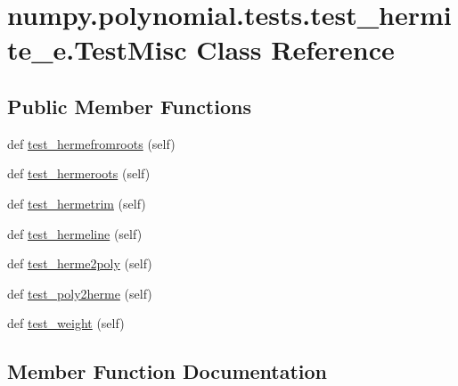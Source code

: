 \hypertarget{classnumpy_1_1polynomial_1_1tests_1_1test__hermite__e_1_1TestMisc}{}\section{numpy.\+polynomial.\+tests.\+test\+\_\+hermite\+\_\+e.\+Test\+Misc Class Reference}
\label{classnumpy_1_1polynomial_1_1tests_1_1test__hermite__e_1_1TestMisc}
\subsection*{Public Member Functions}
\begin{DoxyCompactItemize}
\item 
def \hyperlink{classnumpy_1_1polynomial_1_1tests_1_1test__hermite__e_1_1TestMisc_a3119984cedad7164881e867c00b48673}{test\+\_\+hermefromroots} (self)
\item 
def \hyperlink{classnumpy_1_1polynomial_1_1tests_1_1test__hermite__e_1_1TestMisc_a8bb2872e6118989474bf3235432a8207}{test\+\_\+hermeroots} (self)
\item 
def \hyperlink{classnumpy_1_1polynomial_1_1tests_1_1test__hermite__e_1_1TestMisc_a123f09b85024e0ff541f8f2bd3447167}{test\+\_\+hermetrim} (self)
\item 
def \hyperlink{classnumpy_1_1polynomial_1_1tests_1_1test__hermite__e_1_1TestMisc_a9c07f3dfb7f2b89b2c8d005c746a1ab7}{test\+\_\+hermeline} (self)
\item 
def \hyperlink{classnumpy_1_1polynomial_1_1tests_1_1test__hermite__e_1_1TestMisc_a5b0a5452b66931625fcea583bfe04807}{test\+\_\+herme2poly} (self)
\item 
def \hyperlink{classnumpy_1_1polynomial_1_1tests_1_1test__hermite__e_1_1TestMisc_a2cc8d6dc4177a06c7b91ac496e44ecbd}{test\+\_\+poly2herme} (self)
\item 
def \hyperlink{classnumpy_1_1polynomial_1_1tests_1_1test__hermite__e_1_1TestMisc_afd331c1e0257d27ec180733136a8ff5c}{test\+\_\+weight} (self)
\end{DoxyCompactItemize}


\subsection{Member Function Documentation}
\mbox{\label{classnumpy_1_1polynomial_1_1tests_1_1test__hermite__e_1_1TestMisc_a5b0a5452b66931625fcea583bfe04807}} 
